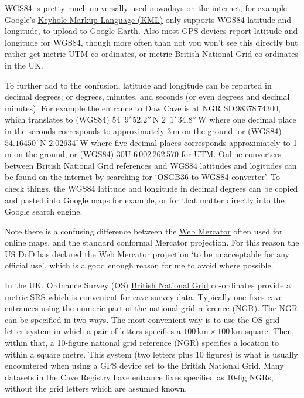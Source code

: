 \documentclass[]{article}
\begin{document}
WGS84 is pretty much universally used nowadays on the internet, for
example Google's \href{https://developers.google.com/kml/}{Keyhole
  Markup Language (KML)} only supports WGS84 latitude and longitude,
to upload to \href{https://en.wikipedia.org/wiki/Google_Earth}{Google
  Earth}.  Also most GPS devices report latitude and longitude for
WGS84, though more often than not you won't see this directly but
rather get metric UTM co-ordinates, or metric British National Grid
co-ordinates in the UK.

To further add to the confusion, latitude and longitude can be
reported in decimal degrees; or degrees, minutes, and seconds (or even
degrees and decimal minutes). For example the entrance to Dow Cave is
at NGR SD\,983{\small78}\,743{\small00}, which translates to (WGS84)
$54^\circ\,9'\,52.2''$\,N $2^\circ\,1'\,34.8''$\,W where one decimal
place in the seconds corresponds to approximately 3\,m on the ground,
or (WGS84) $54.16450^\circ$\,N $2.02634^\circ$\,W where five decimal
places corresponds approximately to 1\,m on the ground, or (WGS84) 30U
6\,002\,262\,570 for UTM. Online converters between British
National Grid references and WGS84 latitudes and logitudes can be
found on the internet by searching for `OSGB36 to WGS84 converter'. To
check things, the WGS84 latitude and longitude in decimal degrees can
be copied and pasted into Google maps for example, or for that matter
directly into the Google search engine.

Note there is a confusing difference between the
\href{https://en.wikipedia.org/wiki/Web_Mercator}{Web Mercator} often
used for online maps, and the standard conformal Mercator projection.
For this reason the US DoD has declared the Web Mercator projection
`to be unacceptable for any official use', which is a good enough
reason for me to avoid where possible.

In the UK, Ordnance Survey (OS)
\href{https://en.wikipedia.org/wiki/Ordnance_Survey_National_Grid}{British
National Grid} co-ordinates provide a metric SRS which is convenient for
cave survey data. Typically one fixes cave entrances using the numeric
part of the national grid reference (NGR). The NGR can be specified in two
ways. The most convenient way is to use the OS grid letter system in
which a pair of letters specifies a
$100\,\mathrm{km}\times100\,\mathrm{km}$ square. Then, within
that, a 10-figure national grid reference (NGR) specifies a location to
within a square metre. This system (two letters plus 10 figures) is what
is usually encountered when using a GPS device set to the British
National Grid. Many datasets in the Cave Registry have entrance fixes
specified as 10-fig NGRs, without the grid letters which are assumed
known.
\end{document}
